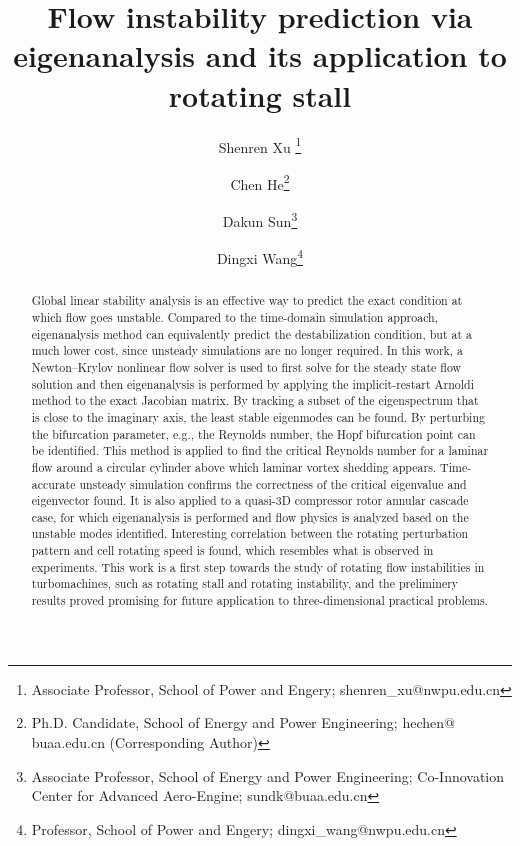 \documentclass[journal,final]{new-aiaa}
\title{Flow instability prediction via eigenanalysis and its application to rotating stall}
\author[1,2]{Shenren Xu	
\footnote{Associate Professor, School of Power and Engery; shenren\_xu@nwpu.edu.cn}}
\affil[1]{Yangtze River Delta Research Institute of NPU, Northwestern Polytechnical University, Taicang~215400, P.R.~China}
\affil[2]{Northwestern Polytechnical University, Xi'an 710072, P.R.~China}
\affil[3]{Beihang University, Beijing 100191, P.R.~China}
\author[3]{Chen He\footnote{Ph.D. Candidate, School of Energy and Power Engineering; hechen@
		buaa.edu.cn (Corresponding Author) }}
\author[3]{Dakun Sun\footnote{Associate Professor, School of Energy and Power Engineering; Co-Innovation
		Center for Advanced Aero-Engine; sundk@buaa.edu.cn}}
\author[2]{Dingxi Wang\footnote{Professor, School of Power and Engery; dingxi\_wang@nwpu.edu.cn }}
\begin{document}
\maketitle

\begin{abstract}
Global linear stability analysis is an effective way to predict the exact condition
at which flow goes unstable. Compared to the time-domain simulation approach,
eigenanalysis method can equivalently predict the destabilization
condition, but at a much lower cost, since unsteady simulations are no longer required.
In this work, a Newton--Krylov nonlinear flow solver is used to first solve for the
steady state flow solution and then eigenanalysis is performed by applying the 
implicit-restart Arnoldi method to the exact Jacobian matrix.
By tracking a subset of the eigenspectrum that is close to the imaginary axis,
the least stable eigenmodes can be found. By perturbing the bifurcation parameter,
e.g., the Reynolds number, the Hopf bifurcation point can be identified.
This method is applied to find the critical Reynolds number for a laminar
flow around a circular cylinder above which laminar vortex shedding appears.
Time-accurate unsteady simulation confirms the correctness of the critical eigenvalue
and eigenvector found. It is also applied to a quasi-3D compressor rotor
annular cascade case, for which eigenanalysis is performed and flow physics
is analyzed based on the unstable modes identified. Interesting correlation
between the rotating perturbation pattern and cell rotating speed is found,
which resembles what is observed in experiments.
This work is a first step towards the study of
rotating flow instabilities in turbomachines, such as rotating stall and rotating instability,
and the preliminery results proved promising for future
application to three-dimensional practical problems.
	

\end{abstract}
\end{document}
